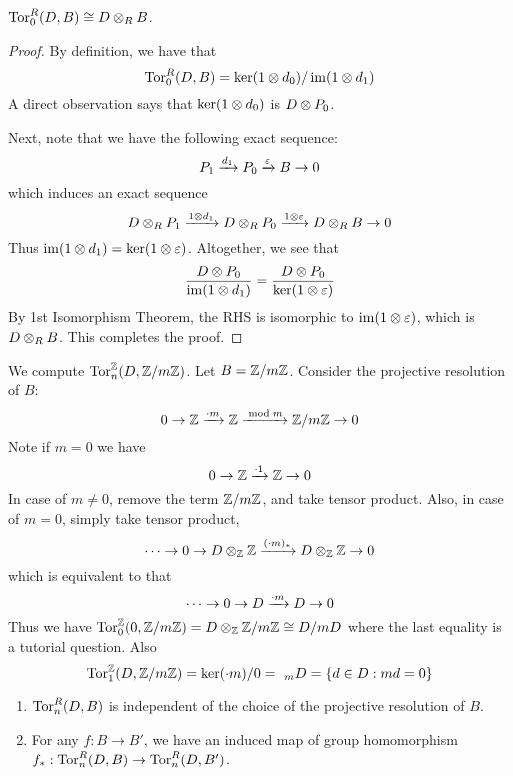 \medskip

\begin{pro}
    $\operatorname{Tor}_0^R(D,B)\cong D\otimes_R B$.
\end{pro}
\begin{proof}
    By definition, we have that 
    \[\operatorname{Tor}_0^R(D,B) = \ker (1\otimes d_0) / \operatorname{im} (1\otimes d_1)\]
    A direct observation says that $\ker (1\otimes d_0)$ is $D\otimes P_0$.

    Next, note that we have the following exact sequence:
    \[P_1 \xrightarrow{d_1} P_0 \xrightarrow{\varepsilon} B \to 0\]
    which induces an exact sequence
    \[D\otimes_R P_1 \xrightarrow{1\otimes d_1} D\otimes_R P_0 \xrightarrow{1\otimes \varepsilon} D\otimes_R B \to 0\]
    Thus $\operatorname{im}(1\otimes d_1) = \ker (1\otimes \varepsilon)$. Altogether, we see that 
    \[\frac{D\otimes P_0}{\operatorname{im} (1\otimes d_1)} = \frac{D\otimes P_0}{\ker(1\otimes \varepsilon)}\]
    By 1st Isomorphism Theorem, the RHS is isomorphic to $\operatorname{im}(1\otimes \varepsilon)$, which is $D\otimes_R B$. This completes the proof.
\end{proof}

\begin{ex}
    We compute $\operatorname{Tor}_n^{\mathbb Z}(D,{\mathbb Z}/m{\mathbb Z})$. Let $B= {\mathbb Z}/m{\mathbb Z}$. Consider the projective resolution of $B$:
    \[0 \to {\mathbb Z} \xrightarrow{\cdot m} {\mathbb Z} \xrightarrow{\bmod m} {\mathbb Z}/m{\mathbb Z}\to 0\]
    Note if $m=0$ we have 
    \[0 \to {\mathbb Z} \xrightarrow{\cdot 1} {\mathbb Z} \to 0\]
    In case of $m\neq 0$, remove the term ${\mathbb Z}/m{\mathbb Z}$, and take tensor product. Also, in case of $m=0$, simply take tensor product, 
    \[\dots \to 0 \to D\otimes_{\mathbb Z} {\mathbb Z} \xrightarrow{(\cdot m)_*} D\otimes_{\mathbb Z} {\mathbb Z} \to 0\]
    which is equivalent to that 
    \[\dots \to 0 \to D \xrightarrow{\cdot m} D \to 0\]
    Thus we have $\operatorname{Tor}_0^{\mathbb Z}(0,{\mathbb Z}/m{\mathbb Z}) = D\otimes_{\mathbb Z} {\mathbb Z}/m{\mathbb Z} \cong D/mD$
    where the last equality is a tutorial question. Also
    \[\operatorname{Tor}_1^{\mathbb Z}(D,{\mathbb Z}/m{\mathbb Z}) = \ker(\cdot m)/0 =\ _mD = \left\{d\in D:md=0\right\}\]
\end{ex}

\medskip

\begin{pro}
    \hfill

    \begin{enumerate}
        \item $\operatorname{Tor}_n^R(D,B)$ is independent of the choice of the projective resolution of $B$.
        \item For any $f:B\to B'$, we have an induced map of group homomorphism $f_*:\operatorname{Tor}_n^R(D,B) \to \operatorname{Tor}_n^R(D,B')$.
    \end{enumerate}
\end{pro}

